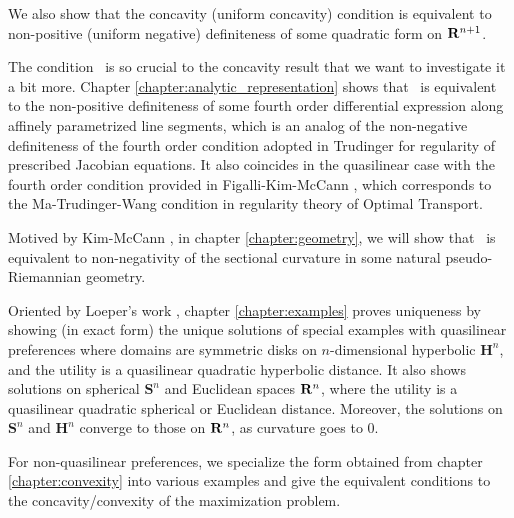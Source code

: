 We also show that the concavity (uniform concavity) condition is equivalent to non-positive (uniform negative) definiteness of some quadratic form on ${\mathbf R}^{n+1}$. \medskip

The condition \Gthree~is so crucial to the concavity result that we want to investigate it a bit more. Chapter \ref{chapter:analytic_representation} shows that \Gthree~is equivalent to the non-positive definiteness of some fourth order differential expression along affinely parametrized line segments, which is an analog of the non-negative definiteness of the fourth order condition adopted in Trudinger \cite{Trudinger14} for regularity of prescribed Jacobian equations. It also coincides in the quasilinear case with the fourth order condition provided in Figalli-Kim-McCann \cite{FigalliKimMcCann11}, which corresponds to the Ma-Trudinger-Wang condition \cite{MaTrudingerWang05} in regularity theory of Optimal Transport.\medskip

Motived by Kim-McCann \cite{KimMcCann10}, in chapter \ref{chapter:geometry}, we will show that \Gthree~is equivalent to non-negativity of the sectional curvature in some natural pseudo-Riemannian geometry.\medskip




Oriented by Loeper's work \cite{Loeper09}, chapter \ref{chapter:examples} proves uniqueness by showing (in exact form) the unique solutions of special examples with quasilinear preferences where domains are symmetric disks on $n$-dimensional hyperbolic $\mathbf{H}^n$, and the utility is a quasilinear quadratic hyperbolic distance. It also shows solutions on spherical $\mathbf{S}^n$ and Euclidean spaces ${\mathbf R}^n$, where the utility is a quasilinear quadratic spherical or Euclidean distance. Moreover, the solutions on $\mathbf{S}^n$ and $\mathbf{H}^n$ converge to those on ${\mathbf R}^n$, as curvature goes to $0$.
\medskip






For non-quasilinear preferences, we specialize the form obtained from chapter \ref{chapter:convexity} into various examples  and give the equivalent conditions to the concavity/convexity of the maximization problem.\medskip


